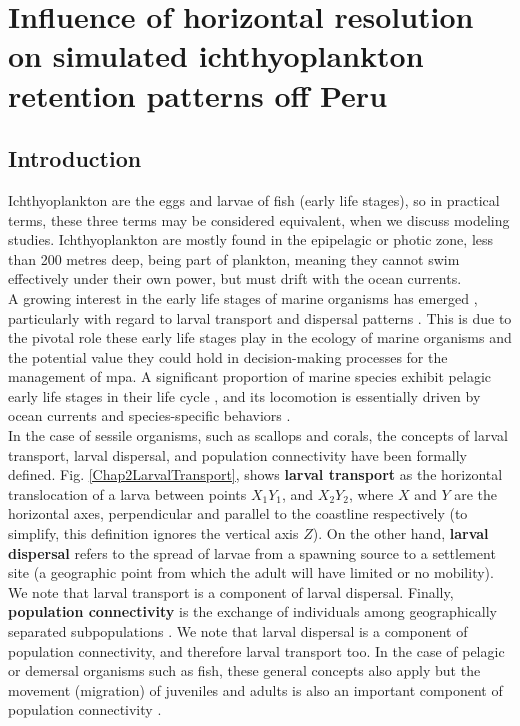 \chapter{Influence of horizontal resolution on simulated ichthyoplankton retention patterns off Peru}\label{Chap2}

\clearpage
\section{Introduction}\label{Chap2Intro}

Ichthyoplankton are the eggs and larvae of fish (early life stages), so in practical terms, these three terms may be considered equivalent, when we discuss modeling studies. Ichthyoplankton are mostly found in the epipelagic or photic zone, less than 200 metres deep, being part of plankton, meaning they cannot swim effectively under their own power, but must drift with the ocean currents.\\

A growing interest in the early life stages of marine organisms has emerged \citep{Stra1993,Have1995,Levi2006,GawaMoni2007,CoweSpon2009}, particularly with regard to larval transport and dispersal patterns \citep{Youn1995,GreeMayp2015,Leis2021}. This is due to the pivotal role these early life stages play in the ecology of marine organisms \citep{MoseSmit1993} and the potential value they could hold in decision-making processes for the management of \acrfull{mpa}\citep{DaloBogd2015}. A significant proportion of marine species exhibit pelagic early life stages in their life cycle \citep{Have1995}, and its locomotion is essentially driven by ocean currents and species-specific behaviors \citep{Levi1990,CowePari2006,DaloBogd2015}.\\

In the case of sessile organisms, such as scallops and corals, the concepts of larval transport, larval dispersal, and population connectivity have been formally defined. Fig. \ref{Chap2LarvalTransport}, shows \textbf{larval transport} as the horizontal translocation of a larva between points $X_{1}Y_{1}$, and $X_{2}Y_{2}$, where $X$ and $Y$ are the horizontal axes, perpendicular and parallel to the coastline respectively (to simplify, this definition ignores the vertical axis $Z$). On the other hand, \textbf{larval dispersal} refers to the spread of larvae from a spawning source to a settlement site (a geographic point from which the adult will have limited or no mobility). We note that larval transport is a component of larval dispersal. Finally, \textbf{population connectivity} is the exchange of individuals among geographically separated subpopulations \citep{PineHare2007}. We note that larval dispersal is a component of population connectivity, and therefore larval transport too. In the case of pelagic or demersal organisms such as fish, these general concepts also apply but the movement (migration) of juveniles and adults is also an important component of population connectivity \citep{NordJoha2011,CaloFeli2013,PanYe2020}.\\

